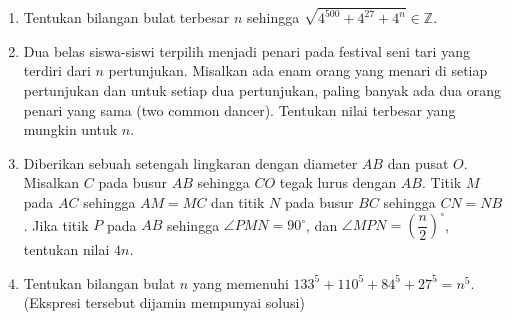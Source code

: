 \documentclass{article}
\begin{document}
\begin{enumerate}[resume]
		\item Tentukan bilangan bulat terbesar $n$ sehingga $\sqrt{4^{500}+4^{27}+4^{n}}\in \mathbb{Z}$.
		
		\item Dua belas siswa-siswi terpilih menjadi penari pada festival seni tari yang terdiri dari $n$ pertunjukan. Misalkan ada enam orang yang menari di setiap pertunjukan dan untuk setiap dua pertunjukan, paling banyak ada dua orang penari yang sama (two common dancer). Tentukan nilai terbesar yang mungkin untuk $n$.
		
		\item Diberikan sebuah setengah lingkaran dengan diameter $AB$ dan pusat $O$. Misalkan $C$ pada busur $AB$ sehingga $CO$ tegak lurus dengan $AB$. Titik $M$ pada $AC$ sehingga $AM=MC$ dan titik $N$ pada busur $BC$ sehingga $CN=NB$. Jika titik $P$ pada $AB$ sehingga $\angle PMN = 90^\circ$, dan $\angle MPN = \left(\dfrac{n}{2}\right)^\circ$, tentukan nilai $4n$.
		
		\item Tentukan bilangan bulat $n$ yang memenuhi $133^5+110^5+84^5+27^5=n^5$. (Ekspresi tersebut dijamin mempunyai solusi)
\end{enumerate}
\end{document}
